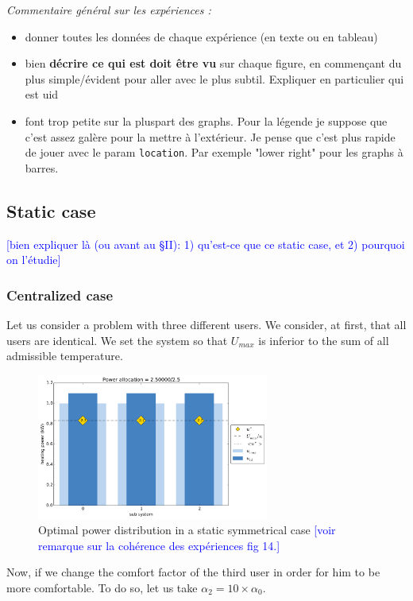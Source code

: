 \documentclass[conference]{IEEEtran}
\newcommand{\rem}[1]{\textcolor{blue}{[#1]}}
\begin{document}
{\itshape Commentaire général sur les expériences :

\begin{itemize}
  \item donner toutes les données de chaque expérience (en texte ou en tableau)
  \item bien \textbf{décrire ce qui est doit être vu} sur chaque figure,
  en commençant du plus simple/évident pour aller avec le plus
  subtil. Expliquer en particulier qui est uid
  \item font trop petite sur la pluspart des graphs. Pour la légende je suppose que c'est assez galère pour la mettre à l'extérieur. Je pense que c'est plus rapide de jouer avec
  le param \texttt{location}. Par exemple "lower right" pour les graphs à barres.
\end{itemize}

}
\subsection{Static case}

\rem{bien expliquer là (ou avant au §II): 1) qu'est-ce que ce static case, et 2) pourquoi on l'étudie}

\subsubsection{Centralized case}



Let us consider a problem with three different users. We consider, at first, that all users are identical. We set the system so that $U_{max}$ is inferior to the sum of all admissible temperature. 
\begin{figure}[H]
\centering
\includegraphics[width=3in]{static_PB_init.pdf}
\caption{Optimal power distribution in a static symmetrical case
\rem{voir remarque sur la cohérence des expériences fig 14.}
}
\label{statPBinit}
\end{figure}

Now, if we change the comfort factor of the third user in order for him to be more comfortable. To do so, let us take $\alpha_2 = 10\times  \alpha_0 $.
\end{document}
